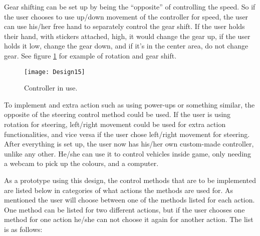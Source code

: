 \bigskip

Gear shifting can be set up by being the “opposite” of controlling the speed. So if the user chooses to use up/down movement of the controller for speed, the user can use his/her free hand to separately control the gear shift. If the user holds their hand, with stickers attached, high, it would change the gear up, if the user holds it low, change the gear down, and if it’s in the center area, do not change gear. See figure \ref{fig:design15} for example of rotation and gear shift.

\begin{figure}[h]
\centering
\texttt{[image: Design15]}
\caption{Controller in use.}
\label{fig:design15}
\end{figure}

To implement and extra action such as using power-ups or something similar, the opposite
of the steering control method could be used. If the user is using rotation for steering,
left/right movement could be used for extra action functionalities, and vice versa if the user
chose left/right movement for steering. After everything is set up, the user now has his/her own custom-made controller, unlike any other. He/she can use it to control vehicles inside game, only needing a webcam to pick up the colours, and a computer.
\bigskip

As a prototype using this design, the control methods that are to be implemented are listed below in categories of what actions the methods are used for. As mentioned the user will choose between one of the methods listed for each action. One method can be listed for two different actions, but if the user chooses one method for one action he/she can not choose it again for another action. The list is as follows:

